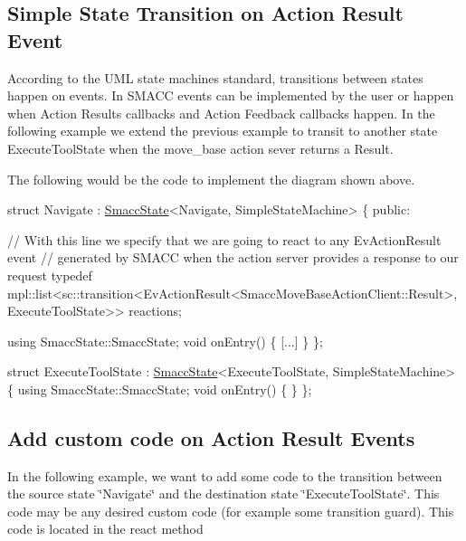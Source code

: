 \subsection*{Simple State Transition on Action Result Event}

According to the U\+ML state machines standard, transitions between states happen on events. In S\+M\+A\+CC events can be implemented by the user or happen when Action Results callbacks and Action Feedback callbacks happen. In the following example we extend the previous example to transit to another state \textquotesingle{}Execute\+Tool\+State\textquotesingle{} when the move\+\_\+base action sever returns a Result.

 

The following would be the code to implement the diagram shown above.


\begin{DoxyCode}
\textcolor{keyword}{struct }Navigate : \hyperlink{classSmaccState}{SmaccState}<Navigate, SimpleStateMachine>
\{
\textcolor{keyword}{public}:

  \textcolor{comment}{// With this line we specify that we are going to react to any EvActionResult event}
  \textcolor{comment}{// generated by SMACC when the action server provides a response to our request}
  \textcolor{keyword}{typedef} mpl::list<sc::transition<EvActionResult<SmaccMoveBaseActionClient::Result>, ExecuteToolState>> 
      reactions;

  \textcolor{keyword}{using} SmaccState::SmaccState;
  \textcolor{keywordtype}{void} onEntry()
  \{
   [...]
  \}
\};

\textcolor{keyword}{struct }ExecuteToolState : \hyperlink{classSmaccState}{SmaccState}<ExecuteToolState, SimpleStateMachine>
\{
    \textcolor{keyword}{using} SmaccState::SmaccState;
    \textcolor{keywordtype}{void} onEntry()
    \{
    \}
\};
\end{DoxyCode}


\subsection*{Add custom code on Action Result Events}

In the following example, we want to add some code to the transition between the source state \char`\"{}\+Navigate\char`\"{} and the destination state \char`\"{}\+Execute\+Tool\+State\char`\"{}. This code may be any desired custom code (for example some transition guard). This code is located in the react method

